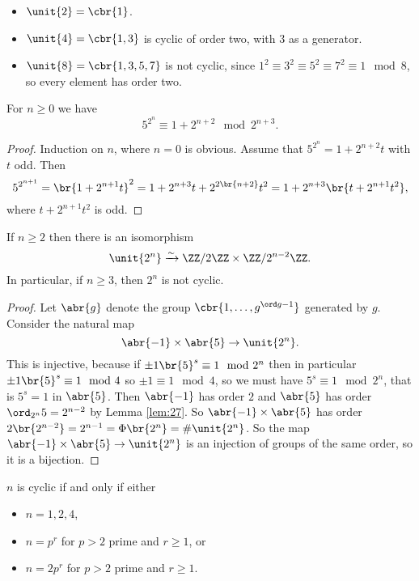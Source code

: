 \begin{example*}
\hfill
\begin{itemize}
\item $ \unit{2} = \cbr{1} $.
\item $ \unit{4} = \cbr{1, 3} $ is cyclic of order two, with $ 3 $ as a generator.
\item $ \unit{8} = \cbr{1, 3, 5, 7} $ is not cyclic, since $ 1^2 \equiv 3^2 \equiv 5^2 \equiv 7^2 \equiv 1 \mod 8 $, so every element has order two.
\end{itemize}
\end{example*}

\pagebreak

\begin{lemma}
\label{lem:27}
For $ n \ge 0 $ we have
$$ 5^{2^n} \equiv 1 + 2^{n + 2} \mod 2^{n + 3}. $$
\end{lemma}

\begin{proof}
Induction on $ n $, where $ n = 0 $ is obvious. Assume that $ 5^{2^n} = 1 + 2^{n + 2}t $ with $ t $ odd. Then
$$ 5^{2^{n + 1}} = \br{1 + 2^{n + 1}t}^2 = 1 + 2^{n + 3}t + 2^{2\br{n + 2}}t^2 = 1 + 2^{n + 3}\br{t + 2^{n + 1}t^2}, $$
where $ t + 2^{n + 1}t^2 $ is odd.
\end{proof}

\begin{proposition}
If $ n \ge 2 $ then there is an isomorphism
$$ \unit{2^n} \xrightarrow{\sim} \ZZ / 2\ZZ \times \ZZ / 2^{n - 2}\ZZ. $$
In particular, if $ n \ge 3 $, then $ \unit{2^n} $ is not cyclic.
\end{proposition}

\begin{proof}
Let $ \abr{g} $ denote the group $ \cbr{1, \dots, g^{\ord g - 1}} $ generated by $ g $. Consider the natural map
$$ \abr{-1} \times \abr{5} \to \unit{2^n}. $$
This is injective, because if $ \pm 1\br{5}^s \equiv 1 \mod 2^n $ then in particular $ \pm 1\br{5}^s \equiv 1 \mod 4 $ so $ \pm 1 \equiv 1 \mod 4 $, so we must have $ 5^s \equiv 1 \mod 2^n $, that is $ 5^s = 1 $ in $ \abr{5} $. Then $ \abr{-1} $ has order $ 2 $ and $ \abr{5} $ has order $ \ord_{2^n} 5 = 2^{n - 2} $ by Lemma \ref{lem:27}. So $ \abr{-1} \times \abr{5} $ has order $ 2\br{2^{n - 2}} = 2^{n - 1} = \Phi\br{2^n} = \#\unit{2^n} $. So the map $ \abr{-1} \times \abr{5} \to \unit{2^n} $ is an injection of groups of the same order, so it is a bijection.
\end{proof}

\begin{theorem}
$ \unit{n} $ is cyclic if and only if either
\begin{itemize}
\item $ n = 1, 2, 4 $,
\item $ n = p^r $ for $ p > 2 $ prime and $ r \ge 1 $, or
\item $ n = 2p^r $ for $ p > 2 $ prime and $ r \ge 1 $.
\end{itemize}
\end{theorem}

